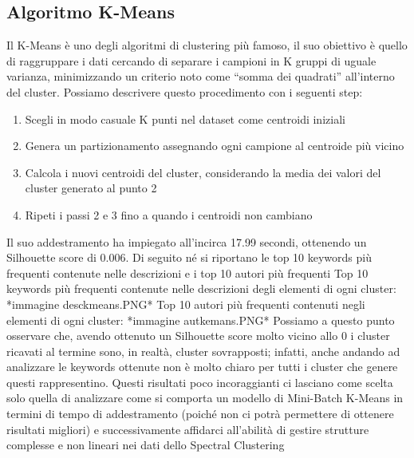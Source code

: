 \documentclass[12pt,oneside]{article}
\begin{document}
    \begin{enumerate}
    \subsection{Algoritmo K-Means}
    \begin{justify}
        Il K-Means è uno degli algoritmi di clustering più famoso, il suo obiettivo è quello di raggruppare i dati cercando di separare i campioni in K gruppi di uguale varianza, minimizzando un criterio noto come “somma dei quadrati” all'interno del cluster. Possiamo descrivere questo procedimento con i seguenti step:
        \begin{enumerate}[label=\arabic*)]
            \item Scegli in modo casuale K punti nel dataset come centroidi iniziali
            \item Genera un partizionamento assegnando ogni campione al centroide più vicino
            \item Calcola i nuovi centroidi del cluster, considerando la media dei valori del cluster generato al punto 2
            \item Ripeti i passi 2 e 3 fino a quando i centroidi non cambiano
        \end{enumerate}
        Il suo addestramento ha impiegato all’incirca 17.99 secondi, ottenendo un Silhouette score di 0.006. Di seguito né si riportano le top 10 keywords più frequenti contenute nelle descrizioni e i top 10 autori più frequenti
        Top 10 keywords più frequenti contenute nelle descrizioni degli elementi di ogni cluster:
        *immagine desckmeans.PNG*
        Top 10 autori più frequenti contenuti negli elementi di ogni cluster:
        *immagine autkemans.PNG*
        Possiamo a questo punto osservare che, avendo ottenuto un Silhouette score molto vicino allo 0 i cluster ricavati al termine sono, in realtà, cluster sovrapposti; infatti, anche andando ad analizzare le keywords ottenute non è molto chiaro per tutti i cluster che genere questi rappresentino. Questi risultati poco incoraggianti ci lasciano come scelta solo quella di analizzare come si comporta un modello di Mini-Batch K-Means in termini di tempo di addestramento (poiché non ci potrà permettere di ottenere risultati migliori) e successivamente affidarci all’abilità di gestire strutture complesse e non lineari nei dati dello Spectral Clustering
    \end{justify}
    \end{enumerate}
\end{document}
